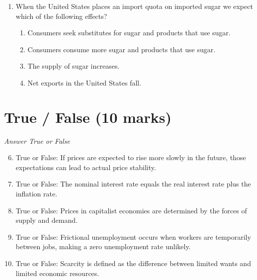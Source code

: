 \documentclass[12pt]{article}
\begin{document}
\begin{enumerate}[label=\arabic*.]
\begin{enumerate}[label=(\alph*)]
    \item The firm will engage in non-price competition.
    \item The firm will realize economic profits.
    \item The firm will incur economic losses.
    \item The firm will realize zero economic profits.
\end{enumerate}
\item When the United States places an import quota on imported sugar we expect which of the following effects?
\begin{enumerate}[label=(\alph*)]
    \item Consumers seek substitutes for sugar and products that use sugar.
    \item Consumers consume more sugar and products that use sugar.
    \item The supply of sugar increases.
    \item Net exports in the United States fall.
\end{enumerate}
\end{enumerate}

\section*{True / False (10 marks)}
\textit{Answer True or False}
\begin{enumerate}[label=\arabic*.]
\setcounter{enumi}{5}
\item True or False: If prices are expected to rise more slowly in the future, those expectations can lead to actual price stability.
\item True or False: The nominal interest rate equals the real interest rate plus the inflation rate.
\item True or False: Prices in capitalist economies are determined by the forces of supply and demand.
\item True or False: Frictional unemployment occurs when workers are temporarily between jobs, making a zero unemployment rate unlikely.
\item True or False: Scarcity is defined as the difference between limited wants and limited economic resources.
\end{enumerate}
\end{document}
